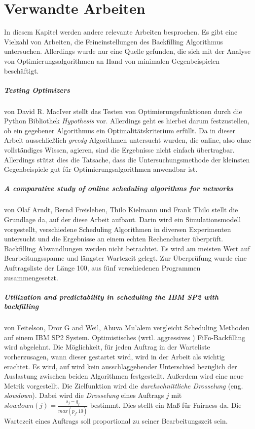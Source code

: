 \chapter{Verwandte Arbeiten}
\label{chap:related_work}
In diesem Kapitel werden andere relevante Arbeiten besprochen. Es gibt eine Vielzahl von Arbeiten, die Feineinstellungen des Backfilling Algorithmus untersuchen. Allerdings wurde nur eine Quelle gefunden, die sich mit der Analyse von Optimierungsalgorithmen an Hand von minimalen Gegenbeispielen beschäftigt.

\paragraph{Testing Optimizers} von David R. MacIver \cite{TestOpt} stellt das Testen von Optimierungsfunktionen durch die Python Bibliothek \emph{Hypothesis} vor. Allerdings geht es hierbei darum festzustellen, ob ein gegebener Algorithmus ein Optimalitätskriterium erfüllt. Da in dieser Arbeit ausschließlich \emph{greedy} Algorithmen untersucht wurden, die online, also ohne vollständiges Wissen, agieren, sind die Ergebnisse nicht einfach übertragbar. Allerdings stützt dies die Tatsache, dass die Untersuchungsmethode der kleinsten Gegenbeispiele gut für Optimierungsalgorithmen anwendbar ist.

\paragraph{A comparative study of online scheduling algorithms for networks} von Olaf Arndt, Bernd Freisleben, Thilo Kielmann und Frank Thilo \cite{Arn99} stellt die Grundlage da, auf der diese Arbeit aufbaut. Darin wird ein Simulationsmodell vorgestellt, verschiedene Scheduling Algorithmen in diversen Experimenten untersucht und die Ergebnisse an einem echten Rechencluster überprüft. Backfilling Abwandlungen werden nicht betrachtet. Es wird am meisten Wert auf Bearbeitungsspanne und längster Wartezeit gelegt. Zur Überprüfung wurde eine Auftragsliste der Länge 100, aus fünf verschiedenen Programmen zusammengesetzt.

\paragraph{Utilization and predictability in scheduling the IBM SP2 with backfilling}
von Feitelson, Dror G and Weil, Ahuva Mu'alem \cite{optVsCons} vergleicht Scheduling Methoden auf einem IBM SP2 System. Optimistisches (wrtl. aggressives \cite[p. ~ 543]{optVsCons}) FiFo-Backfilling wird abgelehnt. Die Möglichkeit, für jeden Auftrag in der Warteliste vorherzusagen, wann dieser gestartet wird, wird in der Arbeit als wichtig erachtet. Es wird, auf wird kein ausschlaggebender Unterschied bezüglich der Auslastung zwischen beiden Algorithmen festgestellt. Außerdem wird eine neue Metrik vorgestellt.
Die Zielfunktion wird die \emph{durchschnittliche Drosselung} (eng. \emph{slowdown}). Dabei wird die \emph{Drosselung} eines Auftrags $j$ mit $slowdown(j) = \frac{s_j - q_j}{max(p_j,10)}$ bestimmt. Dies stellt ein Maß für Fairness da. Die Wartezeit eines Auftrags soll proportional zu seiner Bearbeitungszeit sein.


